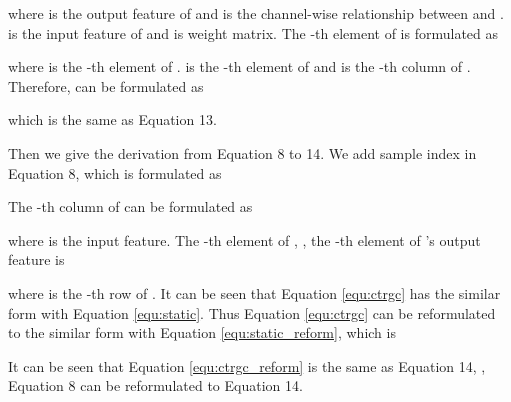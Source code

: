 \documentclass[10pt,twocolumn,letterpaper]{article}
\begin{document}
where  is the output feature of  and  is the channel-wise relationship between  and .  is the input feature of  and  is weight matrix. The -th element of  is formulated as
\vspace{-0.16cm}

where  is the -th element of .   is the -th element of  and  is the -th column of . Therefore,  can be formulated as
\vspace{-0.16cm}

which is the same as Equation {\color{blue}13}.

Then we give the derivation from Equation {\color{blue}8} to {\color{blue}14}. We add sample index  in Equation {\color{blue}8}, which is formulated as
\vspace{-0.16cm}


The -th column of  can be formulated as
\vspace{-0.16cm}

where  is the input feature. The -th element of , \ie, the -th element of 's output feature is

where  is the -th row of . It can be seen that Equation \ref{equ:ctrgc} has the similar form with Equation \ref{equ:static}. Thus Equation \ref{equ:ctrgc} can be reformulated to the similar form with Equation \ref{equ:static_reform}, which is
\vspace{-0.16cm}


It can be seen that Equation \ref{equ:ctrgc_reform} is the same as Equation {\color{blue}14}, \ie, Equation {\color{blue}8} can be reformulated to Equation {\color{blue}14}.
\end{document}
